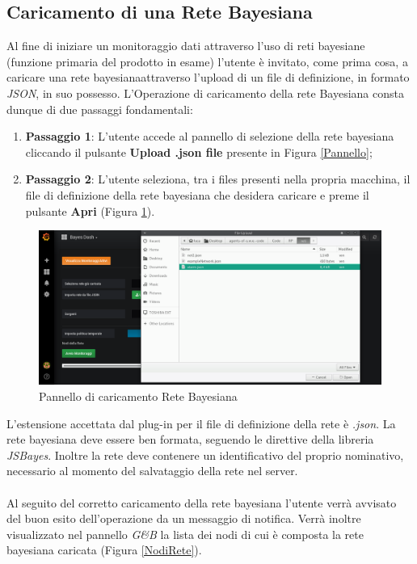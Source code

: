 \subsection{Caricamento di una Rete Bayesiana}\label{ReteB}

Al fine di iniziare un monitoraggio dati attraverso l'uso di reti bayesiane (funzione primaria del prodotto in esame) l'utente è invitato, come prima cosa, a caricare una rete bayesiana\glossario attraverso l'upload di un file di definizione, in formato \textit{JSON}, in suo possesso. L'Operazione di caricamento della rete Bayesiana consta dunque di due passaggi fondamentali:
\begin{enumerate}
	\item \textbf{Passaggio 1}: L'utente accede al pannello di selezione della rete bayesiana cliccando il pulsante \textbf{Upload .json file} presente in Figura \ref{Pannello};
	\item \textbf{Passaggio 2}: L'utente seleziona, tra i files presenti nella propria macchina, il file di definizione della rete bayesiana che desidera caricare e preme il pulsante \textbf{Apri} (Figura \ref{UploadRete}).
\end{enumerate} 

\begin{figure}[H]
	\begin{center}
		\includegraphics[scale=0.3]{./images/UpRete.png}
		 \caption{Pannello di caricamento Rete Bayesiana}	
		 \label{UploadRete}
	\end{center}
\end{figure}

L'estensione accettata dal plug-in per il file di definizione della rete è \textit{.json}. La rete bayesiana deve essere ben formata, seguendo le direttive della libreria \textit{JSBayes}\glossario. Inoltre la rete deve contenere un identificativo del proprio nominativo, necessario al momento del salvataggio della rete nel server.\\
~\\
Al seguito del corretto caricamento della rete bayesiana l'utente verrà avvisato del buon esito dell'operazione da un messaggio di notifica. Verrà inoltre visualizzato nel pannello \textit{G\&B} la lista dei nodi di cui è composta la rete bayesiana caricata (Figura \ref{NodiRete}).

